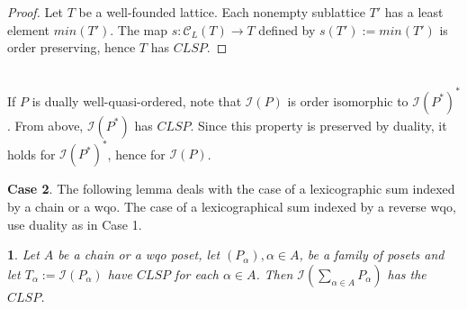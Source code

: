 \documentclass[12pt]{amsart}
\newtheorem{lemma}[definition]{\noindent {\bf Lemma}}
\begin{document}
\begin{proof}
Let $T$ be a well-founded lattice. Each nonempty sublattice $T'$ has a
least element $min(T')$.  The map $s: \mathcal{C}_{ L}(T)\rightarrow
T$ defined by $s(T'):= min(T')$ is order preserving, hence $T$ has $CLSP$.
\end{proof} \\

If $P$ is dually well-quasi-ordered, note that $\mathcal {I}(P)$ is
order isomorphic to $\mathcal {I}(P^*)^*$.  From above, $\mathcal
{I}(P^*)$ has $CLSP$. Since this property is preserved by duality,
it holds for $\mathcal {I}(P^*)^*$, hence for $\mathcal {I}(P)$.

\noindent
{\bf Case 2}.  The following lemma deals with the case of a
lexicographic sum indexed by a chain or a wqo.  The case of a
lexicographical sum indexed by a reverse wqo, use duality as in Case
1.  
 
\begin{lemma} \label{lexicosum}  
Let $A$ be a chain or a wqo poset, let $(P_{\alpha}), \alpha \in A$,
be a family of posets and let $T_{\alpha}:= \mathcal I (P_{\alpha})$
have $CLSP$ for each $\alpha \in A$.  Then $\mathcal {I}(\sum_{\alpha
\in A}P_{\alpha})$ has the $CLSP$.
\end{lemma}
\end{document}
